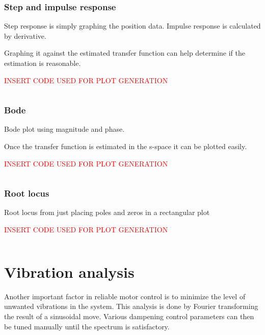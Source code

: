 \subsubsection{Step and impulse response}

Step response is simply graphing the position data. 
Impulse response is calculated by derivative. 

Graphing it against the estimated transfer function can help determine if the estimation is reasonable. 

\textcolor{red}{INSERT CODE USED FOR PLOT GENERATION}
\lstset{style=python}
\begin{lstlisting}[language=python]
\end{lstlisting}

\subsubsection{Bode}

Bode plot using magnitude and phase. 

Once the transfer function is estimated in the s-space it can be plotted easily.

\textcolor{red}{INSERT CODE USED FOR PLOT GENERATION}
\lstset{style=python}
\begin{lstlisting}[language=python]
\end{lstlisting}

\subsubsection{Root locus}

Root locus from just placing poles and zeros in a rectangular plot

\textcolor{red}{INSERT CODE USED FOR PLOT GENERATION}
\lstset{style=python}
\begin{lstlisting}[language=python]
\end{lstlisting}

\section{Vibration analysis}

Another important factor in reliable motor control is to minimize the level of unwanted vibrations in the system.
This analysis is done by Fourier transforming the result of a sinusoidal move. Various dampening control parameters can then be tuned manually until the spectrum is satisfactory. 

